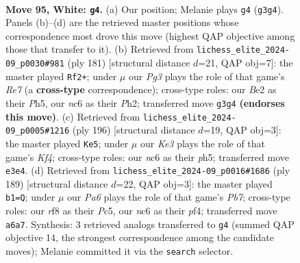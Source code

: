 \documentclass[11pt]{article}
\begin{document}
\clearpage

\begin{figure}[p]\centering
\begin{subfigure}{0.46\textwidth}\centering
\resizebox{\linewidth}{!}{%
\newchessgame
\chessboard[
  setfen={5r2/3k4/PRn5/8/8/4K1PP/2P1B3/8 w - - 23 95},
  showmover=false,
  pgfstyle=straightmove, color=movearrow, markmove={g3-g4}
]}
\caption{}
\end{subfigure}\hfill
\begin{subfigure}{0.46\textwidth}\centering
\resizebox{\linewidth}{!}{%
\newchessgame
\chessboard[
  setfen={8/p3PK2/7k/7p/8/8/4r2p/7R b - - 5 91},
  showmover=false,
  pgfstyle=straightmove, color=movearrow, markmove={e2-f2}
]}
\caption{}
\end{subfigure}
\\[4pt]
\begin{subfigure}{0.46\textwidth}\centering
\resizebox{\linewidth}{!}{%
\newchessgame
\chessboard[
  setfen={2r5/4k3/1R4P1/7p/4BK1P/8/8/8 w - - 1 99},
  showmover=false,
  pgfstyle=straightmove, color=movearrow, markmove={f4-e5}
]}
\caption{}
\end{subfigure}\hfill
\begin{subfigure}{0.46\textwidth}\centering
\resizebox{\linewidth}{!}{%
\newchessgame
\chessboard[
  setfen={8/7p/5k2/2p2b2/2P2P2/6K1/rp6/8 b - - 1 95},
  showmover=false,
  pgfstyle=straightmove, color=movearrow, markmove={b2-b1}
]}
\caption{}
\end{subfigure}
\caption{\textbf{Move 95, White: \texttt{g4}.} (a) Our position; Melanie plays \texttt{g4} (\texttt{g3g4}). Panels (b)--(d) are the retrieved master positions whose correspondence most drove this move (highest QAP objective among those that transfer to it). (b) Retrieved from \texttt{lichess\_elite\_2024-09\_p0030\#981} (ply 181) [structural distance $d$=21, QAP obj=7]: the master played \texttt{Rf2+}; under $\mu$ our \emph{Pg3} plays the role of that game's \emph{Re7} (a \textbf{cross-type} correspondence); cross-type roles: our \emph{B}e2 as their \emph{P}h5, our \emph{n}c6 as their \emph{P}h2; transferred move \texttt{g3g4} \textbf{(endorses this move)}. (c) Retrieved from \texttt{lichess\_elite\_2024-09\_p0005\#1216} (ply 196) [structural distance $d$=19, QAP obj=3]: the master played \texttt{Ke5}; under $\mu$ our \emph{Ke3} plays the role of that game's \emph{Kf4}; cross-type roles: our \emph{n}c6 as their \emph{p}h5; transferred move \texttt{e3e4}. (d) Retrieved from \texttt{lichess\_elite\_2024-09\_p0016\#1686} (ply 189) [structural distance $d$=22, QAP obj=3]: the master played \texttt{b1=Q}; under $\mu$ our \emph{Pa6} plays the role of that game's \emph{Pb7}; cross-type roles: our \emph{r}f8 as their \emph{P}c5, our \emph{n}c6 as their \emph{p}f4; transferred move \texttt{a6a7}. Synthesis: 3 retrieved analogs transferred to \texttt{g4} (summed QAP objective 14, the strongest correspondence among the candidate moves); Melanie committed it via the \texttt{search} selector.}
\label{fig:thought-m188}
\end{figure}
\end{document}
